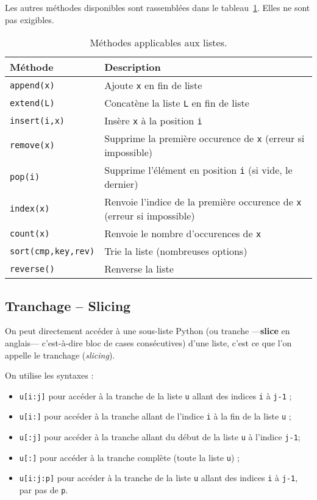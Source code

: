 Les autres méthodes disponibles sont rassemblées dans le tableau~\ref{tab.list.methodes}. Elles ne sont pas exigibles.
\begin{table}[!h]
\centering
    \begin{tabular}{lp{9cm}}
      \hline 
      \textbf{Méthode} & \textbf{Description} \\
      \hline
      \texttt{append(x)} & Ajoute \texttt{x} en fin de liste \\
      \texttt{extend(L)} & Concatène la liste \texttt{L} en fin de liste \\
      \texttt{insert(i,x)} & Insère  \texttt{x} à la position \texttt{i} \\
      \texttt{remove(x)} & Supprime la première occurence de \texttt{x} (erreur si impossible)\\
      \texttt{pop(i)} & Supprime l'élément en position \texttt{i} (si vide, le dernier) \\
      \texttt{index(x)} & Renvoie l'indice de la première occurence de \texttt{x} (erreur si impossible)\\
      \texttt{count(x)} & Renvoie le nombre d'occurences de \texttt{x} \\
      \texttt{sort(cmp,key,rev)} & Trie la liste (nombreuses options) \\
      \texttt{reverse()} & Renverse la liste \\
      \hline
    \end{tabular}
    \caption{Méthodes applicables aux listes.}
  \label{tab.list.methodes}
  \end{table}

%
\subsection{Tranchage -- Slicing}

On peut directement accéder à une sous-liste Python (ou tranche ---\textbf{slice} en anglais--- 
c'est-à-dire bloc de cases consécutives) d'une liste, c'est ce que l'on appelle le tranchage 
(\textit{slicing}).

On utilise les  syntaxes :
\begin{itemize}
  \item \texttt{u[i:j]} pour accéder à la tranche de la liste \texttt{u} allant des indices \texttt{i} à \texttt{j-1} ;
  \item \texttt{u[i:]} pour accéder à la tranche allant de l'indice \texttt{i} à la fin de la liste \texttt{u} ;
  \item \texttt{u[:j]} pour accéder à la tranche allant du début de la liste \texttt{u} à l'indice \texttt{j-1};
  \item \texttt{u[:]} pour accéder à la tranche complète (toute la liste \texttt{u}) ;
  \item \texttt{u[i:j:p]} pour accéder à la tranche de la liste \texttt{u} allant des indices \texttt{i} à \texttt{j-1}, par pas de \texttt{p}.
\end{itemize}

